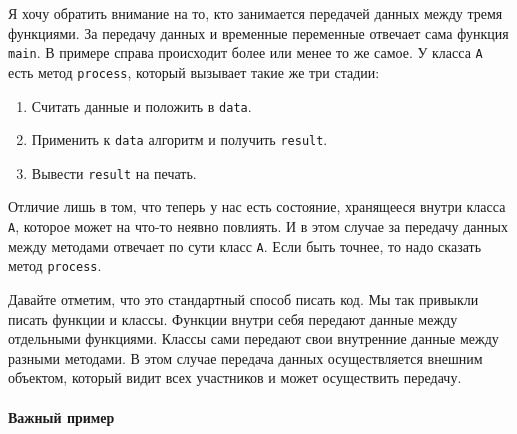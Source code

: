 Я хочу обратить внимание на то, кто занимается передачей данных между тремя функциями.
За передачу данных и временные переменные отвечает сама функция \verb"main".
В примере справа происходит более или менее то же самое.
У класса \verb"A" есть метод \verb"process", который вызывает такие же три стадии:
\begin{enumerate}
\item Считать данные и положить в \verb"data".

\item Применить к \verb"data" алгоритм и получить \verb"result".

\item Вывести \verb"result" на печать.
\end{enumerate}
Отличие лишь в том, что теперь у нас есть состояние, хранящееся внутри класса \verb"A", которое может на что-то неявно повлиять.
И в этом случае за передачу данных между методами отвечает по сути класс \verb"A".
Если быть точнее, то надо сказать метод \verb"process".

Давайте отметим, что это стандартный способ писать код.
Мы так привыкли писать функции и классы.
Функции внутри себя передают данные между отдельными функциями.
Классы сами передают свои внутренние данные между разными методами.
В этом случае передача данных осуществляется внешним объектом, который видит всех участников и может осуществить передачу.


\paragraph{Важный пример}

